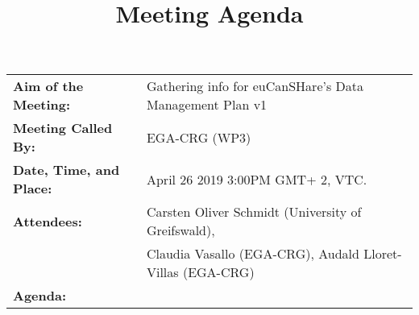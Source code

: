 \documentclass{article}
\begin{document}




\title{Meeting Agenda}
\date{}

%
%


\begin{table}[h]
  \begin{tabular}{ll}
\textbf{Aim of the Meeting:} & Gathering info for euCanSHare's Data Management Plan v1 \\  [5pt]  
\textbf{Meeting Called By:}  &EGA-CRG (WP3)\\[ 5pt]
  \textbf{Date, Time, and Place:}  & April  26 2019 3:00PM GMT+ 2, VTC. \\ [5pt]
  \textbf{Attendees:}  & Carsten Oliver Schmidt (University of Greifswald), \\
 &  Claudia Vasallo (EGA-CRG), Audald Lloret-Villas (EGA-CRG) \\ [50pt]    
\textbf{Agenda:}  &   \\ 
\end{tabular}
\end{table}
%
%

%
%
 
\end{document}
